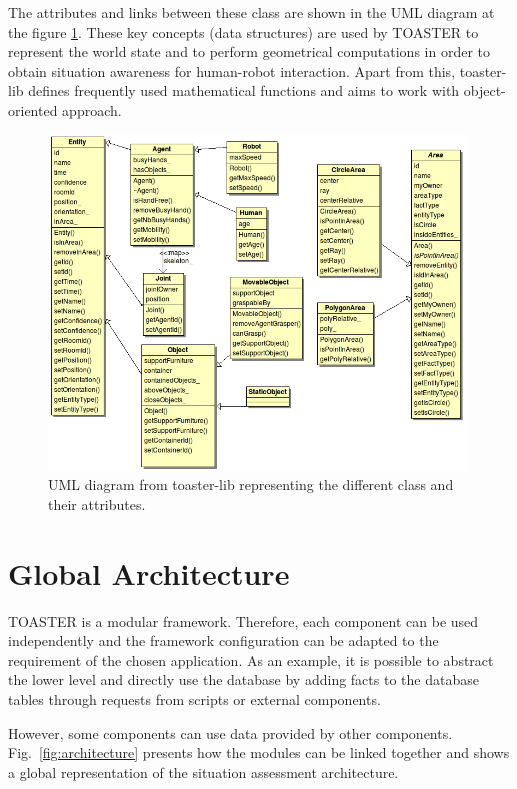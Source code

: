 \documentclass[a4paper]{article}
\begin{document}
The attributes and links between these class are shown in the UML diagram at the figure \ref{fig:umltoasterlib}.
These key concepts (data structures) are used by TOASTER to represent the world state and to perform geometrical computations in order to obtain situation awareness for human-robot interaction. Apart from this, toaster-lib defines frequently used mathematical functions and aims to work with object-oriented approach.


\begin{figure}
  \centering
  \includegraphics[width=0.99\textwidth]{img/uml_toasterLib.png}
  \caption{UML diagram from toaster-lib representing the different class and their attributes.}
  \label{fig:umltoasterlib}
\end{figure}

\section{Global Architecture}
\label{sec:architecture}
TOASTER is a modular framework. Therefore, each component can be used independently and the framework configuration can be adapted to the requirement of the chosen application.
As an example, it is possible to abstract the lower level and directly use the database by adding facts to the database tables through requests from scripts or external components.

However, some components can use data provided by other components. Fig.~\ref{fig:architecture} presents how the modules can be linked together and shows a global representation of the situation assessment architecture.
\end{document}
